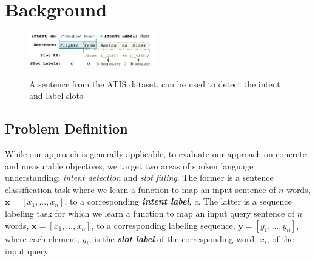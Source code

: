 \section{Background}
\begin{figure}[t!]
  \centering
  \includegraphics[width=0.49\textwidth]{figure/motivation.pdf}\\
  \caption{A sentence from the ATIS dataset. \REs can be used to detect the intent and label slots.}
  \label{atis_sample}
\end{figure}

\subsection{Problem Definition}
While our approach is generally applicable, to evaluate our approach on concrete and measurable objectives, we target two areas of spoken
language understanding: \emph{intent detection} and \emph{slot filling}. The former is a sentence classification task where we learn a
function to map an input sentence of $n$ words, $\textbf{x}=[x_{1}, ..., x_{n}]$, to a corresponding \textbf{\emph{intent label}}, $c$. The latter is a
sequence labeling task for which we learn a function to map an input query sentence of $n$ words, $\textbf{x}=[x_{1}, ..., x_{n}]$, to a
corresponding labeling sequence, $\textbf{y}=[y_{1}, ..., y_{n}]$, where each element, $y_i$, is the \textbf{\emph{slot label}} of the corresponding word,
$x_i$,  of the input query.


%

